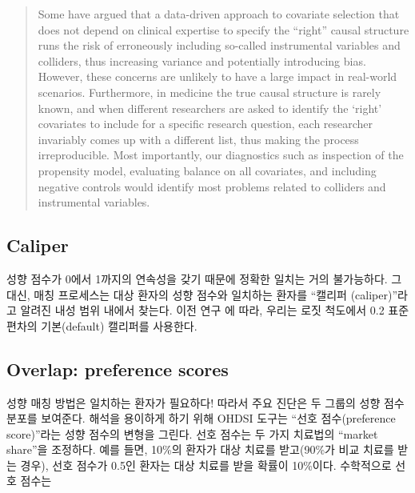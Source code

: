 \documentclass[]{book}
\begin{document}
\begin{quote}
Some have argued that a data-driven approach to covariate selection that does not depend on clinical expertise to specify the ``right'' causal structure runs the risk of erroneously including so-called instrumental variables and colliders, thus increasing variance and potentially introducing bias. \citep{hernan_2002} However, these concerns are unlikely to have a large impact in real-world scenarios. \citep{schneeweiss_2018} Furthermore, in medicine the true causal structure is rarely known, and when different researchers are asked to identify the `right' covariates to include for a specific research question, each researcher invariably comes up with a different list, thus making the process irreproducible. Most importantly, our diagnostics such as inspection of the propensity model, evaluating balance on all covariates, and including negative controls would identify most problems related to colliders and instrumental variables.
\end{quote}

\hypertarget{caliper}{%
\subsection{Caliper}\label{caliper}}


성향 점수가 0에서 1까지의 연속성을 갖기 때문에 정확한 일치는 거의 불가능하다. 그 대신, 매칭 프로세스는 대상 환자의 성향 점수와 일치하는 환자를 ``캘리퍼 (caliper)''라고 알려진 내성 범위 내에서 찾는다. 이전 연구 \citep{austin_2011}에 따라, 우리는 로짓 척도에서 0.2 표준편차의 기본(default) 캘리퍼를 사용한다.

\hypertarget{overlap-preference-scores}{%
\subsection{Overlap: preference scores}\label{overlap-preference-scores}}


성향 매칭 방법은 일치하는 환자가 필요하다! 따라서 주요 진단은 두 그룹의 성향 점수 분포를 보여준다. 해석을 용이하게 하기 위해 OHDSI 도구는 ``선호 점수(preference score)''라는 성향 점수의 변형을 그린다.\citep{walker_2013} 선호 점수는 두 가지 치료법의 ``market share''을 조정하다. 예를 들면, 10\%의 환자가 대상 치료를 받고(90\%가 비교 치료를 받는 경우), 선호 점수가 0.5인 환자는 대상 치료를 받을 확률이 10\%이다. 수학적으로 선호 점수는
\end{document}
